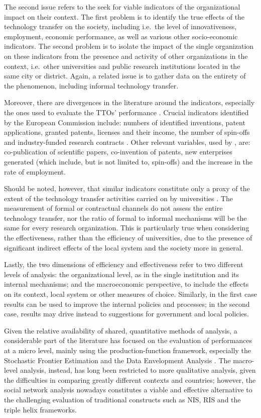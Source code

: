The second issue refers to the seek for viable indicators of the organizational impact on their context. The first problem is to identify the true effects of the technology transfer on the society, including i.e.\ the level of innovativeness, employment, economic performance, as well as various other socio-economic indicators. The second problem is to isolate the impact of the single organization on these indicators from the presence and activity of other organizations in the context, i.e.\ other universities and public research institutions located in the same city or district. Again, a related issue is to gather data on the entirety of the phenomenon, including informal technology transfer. 

Moreover, there are divergences in the literature around the indicators, especially the ones used to evaluate the TTOs' performance \citep{Muscio2010}. Crucial indicators identified by the European Commission include: numbers of identified inventions, patent applications, granted patents, licenses and their income, the number of spin-offs and industry-funded research contracts \citep{Balderi2010}. Other relevant variables, used by \citet{Guerrero2014}, are: co-publication of scientific papers, co-invention of patents, new enterprises generated (which include, but is not limited to, spin-offs) and the increase in the rate of employment. 

Should be noted, however, that similar indicators constitute only a proxy of the extent of the technology transfer activities carried on by universities \citep{Leydesdorff2010}. The measurement of formal or contractual channels do not assess the entire technology transfer, nor the ratio of formal to informal mechanisms will be the same for every research organization. This is particularly true when considering the effectiveness, rather than the efficiency of universities, due to the presence of significant indirect effects of the local system and the society more in general.

Lastly, the two dimensions of efficiency and effectiveness refer to two different levels of analysis: the organizational level, as in the single institution and its internal mechanisms; and the macroeconomic perspective, to include the effects on its context, local system or other measures of choice. Similarly, in the first case results can be used to improve the internal policies and processes; in the second case, results may drive instead to suggestions for government and local policies.

Given the relative availability of shared, quantitative methods of analysis, a considerable part of the literature has focused on the evaluation of performances at a micro level, mainly using the production-function framework, especially the Stochastic Frontier Estimation and the Data Envelopment Analysis \citep{Siegel2007}. The macro-level analysis, instead, has long been restricted to more qualitative analysis, given the difficulties in comparing greatly different contexts and countries; however, the social network analysis nowadays constitutes a viable and effective alternative to the challenging evaluation of traditional constructs such as NIS, RIS and the triple helix frameworks.

